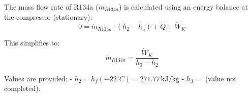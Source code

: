 The mass flow rate of R134a (\( \dot{m}_{R134a} \)) is calculated using an energy balance at the compressor (stationary):  
\[ 0 = \dot{m}_{R134a} \cdot (h_2 - h_3) + \dot{Q} + \dot{W}_K \]  

This simplifies to:  
\[ \dot{m}_{R134a} = \frac{\dot{W}_K}{h_3 - h_2} \]  

Values are provided:  
- \( h_2 = h_f (-22^\circ C) = 271.77 \, \text{kJ/kg} \)  
- \( h_3 = \) (value not completed).